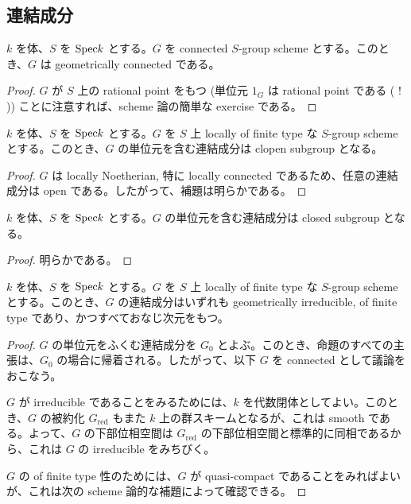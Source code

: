\subsection{連結成分}
\begin{prop}
  $k$ を体、$S$ を $\mathrm{Spec} k$ とする。$G$ を connected $S$-group scheme とする。このとき、$G$ は geometrically connected である。
\end{prop}
\begin{proof}
  $G$ が $S$ 上の rational point をもつ (単位元 $1_G$ は rational point である ( ! )) ことに注意すれば、scheme 論の簡単な exercise である。
\end{proof}

\begin{lem}
  $k$ を体、$S$ を $\mathrm{Spec} k$ とする。$G$ を $S$ 上 locally of finite type な $S$-group scheme とする。このとき、$G$ の単位元を含む連結成分は clopen subgroup となる。
\end{lem}
\begin{proof}
  $G$ は locally Noetherian, 特に locally connected であるため、任意の連結成分は open である。したがって、補題は明らかである。
\end{proof}

\begin{lem}
  $k$ を体、$S$ を $\mathrm{Spec} k$ とする。$G$ の単位元を含む連結成分は closed subgroup となる。
\end{lem}
\begin{proof}
  明らかである。
\end{proof}

\begin{prop}
  $k$ を体、$S$ を $\mathrm{Spec} k$ とする。$G$ を $S$ 上 locally of finite type な $S$-group scheme とする。このとき、$G$ の連結成分はいずれも geometrically irreducible, of finite type であり、かつすべておなじ次元をもつ。
\end{prop}
\begin{proof}
  $G$ の単位元をふくむ連結成分を $G_0$ とよぶ。このとき、命題のすべての主張は、$G_0$ の場合に帰着される。したがって、以下 $G$ を connected として議論をおこなう。

  $G$ が irreducible であることをみるためには、$k$ を代数閉体としてよい。このとき、$G$ の被約化 $G_\mathrm{red}$ もまた $k$ 上の群スキームとなるが、これは smooth である。よって、$G$ の下部位相空間は $G_\mathrm{red}$ の下部位相空間と標準的に同相であるから、これは $G$ の irreducible をみちびく。

  $G$ の of finite type 性のためには、$G$ が quasi-compact であることをみればよいが、これは次の scheme 論的な補題によって確認できる。
\end{proof}

